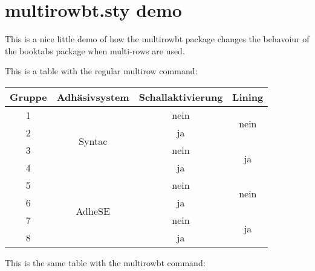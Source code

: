 \documentclass{article}
\begin{document}
\section*{multirowbt.sty demo}

This is a nice little demo of how the multirowbt package changes the behavoiur of the booktabs package when multi-rows are used.

\bigskip

This is a table with the regular multirow command:\\

\begin{centering}

\begin{tabular}{cccc}
\toprule
Gruppe & Adh\"asivsystem            & Schallaktivierung & Lining               \\
\midrule
1      & \multirow{4}{*}{Syntac} & nein                & \multirow{2}{*}{nein} \\
\cmidrule{1-1}\cmidrule{3-3}
2      &                           & ja                &                       \\
\cmidrule{1-1}\cmidrule{3-4}
3      &                           & nein              & \multirow{2}{*}{ja}   \\
\cmidrule{1-1}\cmidrule{3-3}
4      &                           & ja                &                       \\
\midrule
5      & \multirow{4}{*}{AdheSE} & nein                & \multirow{2}{*}{nein} \\
\cmidrule{1-1}\cmidrule{3-3}
6      &                           & ja                &                       \\
\cmidrule{1-1}\cmidrule{3-4}
7      &                           & nein              & \multirow{2}{*}{ja}   \\
\cmidrule{1-1}\cmidrule{3-3}
8      &                           & ja                &                       \\
\bottomrule
\end{tabular}

\end{centering}

\bigskip

This is the same table with the multirowbt command:\\
\end{document}
